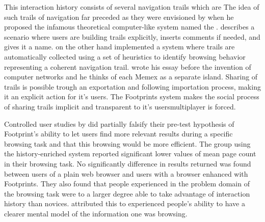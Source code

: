 This interaction history consists of several navigation trails which are
The idea of such trails of navigation far preceded \citeauthor{wexelblat99}
as they were envisioned by \citet{bush45} when he proposed the infamous
theoretical computer-like system named the %
.
\citeauthor{bush45} describes a scenario where users are building trails
explicitly, inserts comments if needed, and gives it a name.
\citeauthor{wexelblat99} on the other hand
implemented a system where trails are automatically collected using a set of
heuristics to identify browsing behavior representing a coherent navigation
trail.
\citeauthor{bush45} wrote his essay before the invention of computer networks
and he thinks of each Memex as a separate island. Sharing of trails is
possible trough an exportation and following importation process, making it an
explicit action for it's users.
The Footprints system makes the social process of sharing trails implicit and
transparent to it's users\dash{}multiplayer is forced.

Controlled user studies by \citeauthor{wexelblat99} did partially falsify
their pre-test hypothesis of Footprint's ability to let users find more
relevant results during a specific browsing task and that this browsing
would be more efficient. The group using the history-enriched system reported
significant lower values of mean page count in their browsing task. No
significantly difference in results returned was found between users of a
plain web browser and users with a browser enhanced with Footprints. They also
found that people experienced in the problem domain of the browsing task were
to a larger degree able to take advantage of interaction history than novices.
\citeauthor{wexelblat99} attributed this to experienced people's ability to
have a clearer mental model of the information one was browsing.

